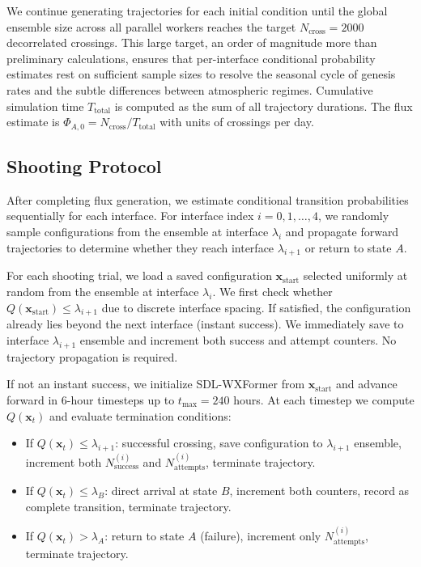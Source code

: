 \documentclass[11pt]{article}
\begin{document}
We continue generating trajectories for each initial condition until the global ensemble size across all parallel workers reaches the target $N_{\text{cross}} = 2000$ decorrelated crossings. This large target, an order of magnitude more than preliminary calculations, ensures that per-interface conditional probability estimates rest on sufficient sample sizes to resolve the seasonal cycle of genesis rates and the subtle differences between atmospheric regimes. Cumulative simulation time $T_{\text{total}}$ is computed as the sum of all trajectory durations. The flux estimate is $\Phi_{A,0} = N_{\text{cross}}/T_{\text{total}}$ with units of crossings per day.

\subsection{Shooting Protocol}

After completing flux generation, we estimate conditional transition probabilities sequentially for each interface. For interface index $i = 0, 1, \ldots, 4$, we randomly sample configurations from the ensemble at interface $\lambda_i$ and propagate forward trajectories to determine whether they reach interface $\lambda_{i+1}$ or return to state $A$.

For each shooting trial, we load a saved configuration $\mathbf{x}_{\text{start}}$ selected uniformly at random from the ensemble at interface $\lambda_i$. We first check whether $Q(\mathbf{x}_{\text{start}}) \leq \lambda_{i+1}$ due to discrete interface spacing. If satisfied, the configuration already lies beyond the next interface (instant success). We immediately save to interface $\lambda_{i+1}$ ensemble and increment both success and attempt counters. No trajectory propagation is required.

If not an instant success, we initialize SDL-WXFormer from $\mathbf{x}_{\text{start}}$ and advance forward in 6-hour timesteps up to $t_{\text{max}} = 240$ hours. At each timestep we compute $Q(\mathbf{x}_t)$ and evaluate termination conditions:

\begin{itemize}
    \item If $Q(\mathbf{x}_t) \leq \lambda_{i+1}$: successful crossing, save configuration to $\lambda_{i+1}$ ensemble, increment both $N_{\text{success}}^{(i)}$ and $N_{\text{attempts}}^{(i)}$, terminate trajectory.
    
    \item If $Q(\mathbf{x}_t) \leq \lambda_B$: direct arrival at state $B$, increment both counters, record as complete transition, terminate trajectory.
    
    \item If $Q(\mathbf{x}_t) > \lambda_A$: return to state $A$ (failure), increment only $N_{\text{attempts}}^{(i)}$, terminate trajectory.
\end{itemize}
\end{document}

